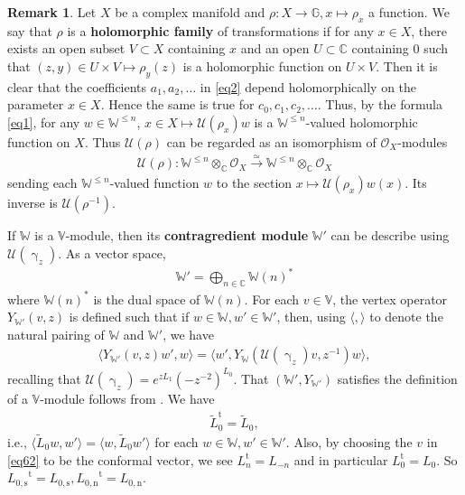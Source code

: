 \documentclass[12pt,a4paper,notitlepage]{article}
\theoremstyle{definition}
\newtheorem{rem}[df]{Remark}
\theoremstyle{plain}
\newcommand{\mc}{\mathcal}
\newcommand{\wtd}{\widetilde}
\newcommand{\tr}{\mathrm{t}} %
\newcommand{\bk}[1]{\langle {#1}\rangle}
\newcommand{\scr}{\mathscr}
\newcommand{\mbb}{\mathbb}
\newcommand{\Vbb}{\mathbb V}
\newcommand{\Wbb}{\mathbb W}
\newcommand{\Cbb}{\mathbb C}
\newcommand{\Lss}{{L_{0,\mathrm{s}}}}
\newcommand{\Lni}{{L_{0,\mathrm{n}}}}
\numberwithin{equation}{section}
\begin{document}
\begin{rem}\label{lb2}
Let $X$ be a complex manifold and $\rho:X\rightarrow\mbb G,x\mapsto \rho_x$ a function. We say that $\rho$ is a \textbf{holomorphic family} of transformations if for any $x\in X$, there exists an open subset $V\subset X$ containing $x$ and an open $U\subset\Cbb$ containing $0$ such that  $(z,y)\in U\times V\mapsto \rho_y(z)$ is a holomorphic function on $U\times V$. Then it is clear that the coefficients $a_1,a_2,\dots$ in \eqref{eq2} depend holomorphically on the parameter $x\in X$. Hence the same is true for $c_0,c_1,c_2,\dots$. Thus, by the formula \eqref{eq1}, for any $w\in\Wbb^{\leq n}$, $x\in X\mapsto \mc U(\rho_x)w$ is a $\Wbb^{\leq n}$-valued holomorphic function on $X$. Thus $\mc U(\rho)$ can be regarded as an isomorphism of  $\scr O_X$-modules 
\begin{align}
\mc U(\rho): \Wbb^{\leq n}\otimes_{\Cbb}\scr O_X\xrightarrow{\simeq}\Wbb^{\leq n}\otimes_{\Cbb}\scr O_X
\end{align}
sending each $\Wbb^{\leq n}$-valued function $w$ to the section $x\mapsto \mc U(\rho_x)w(x)$. \index{U@$\mc U(\rho)$} Its inverse is  $\mc U(\rho^{-1})$.
\end{rem}







If $\Wbb$ is a $\Vbb$-module, then its \textbf{contragredient module} $\Wbb'$ \index{W'@$\Wbb'$} can be describe using $\mc U(\upgamma_z)$. As a vector space,
\begin{align*}
\Wbb'=\bigoplus_{n\in\Cbb}\Wbb{(n)}^*
\end{align*}
where $\Wbb{(n)}^*$ is the dual space of $\Wbb{(n)}$. For each $v\in\Vbb$, the vertex operator $Y_{\Wbb'}(v,z)$ is defined such that if $w\in\Wbb,w'\in\Wbb'$, then, using $\bk{,}$ to denote the natural pairing of $\Wbb$ and $\Wbb'$, we have 
\begin{align}
\bk{Y_{\Wbb'}(v,z)w',w}=\bk{w',Y_\Wbb(\mc U(\upgamma_z)v,z^{-1})w},\label{eq62}
\end{align}
recalling that $\mc U(\upgamma_z)=e^{zL_1}(-z^{-2})^{L_0}$. That  $(\Wbb',Y_{\Wbb'})$ satisfies the definition of a $\Vbb$-module follows from \cite{FHL93}. We have 
\begin{align}
	\wtd L_0^\tr=\wtd L_0,\label{eq99}
\end{align}
i.e., $\bk{\wtd L_0w,w'}=\bk{w,\wtd L_0w'}$ for each $w\in\Wbb,w'\in\Wbb'$. Also, by choosing the $v$ in \eqref{eq62} to be the conformal vector, we see $L_n^\tr=L_{-n}$ and in particular $L_0^\tr=L_0$. So $\Lss^\tr=\Lss,\Lni^\tr=\Lni$.
\end{document}

